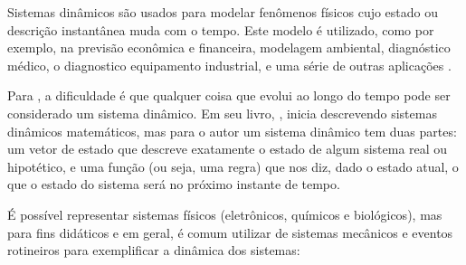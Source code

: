 Sistemas dinâmicos são usados para modelar fenômenos físicos cujo estado ou descrição instantânea muda com o tempo. Este modelo é utilizado, como por exemplo, na previsão econômica e financeira, modelagem ambiental, diagnóstico médico, o diagnostico equipamento industrial, e uma série de outras aplicações \cite{Dean1991}.

Para , a dificuldade é que qualquer coisa que evolui ao longo do tempo pode ser considerado um sistema dinâmico. Em seu livro, , inicia descrevendo sistemas dinâmicos matemáticos, mas para o autor um sistema dinâmico tem duas partes: um vetor de estado que descreve exatamente o estado de algum sistema real ou hipotético, e uma função (ou seja, uma regra) que nos diz, dado o estado atual, o que o estado do sistema será no próximo instante de tempo.

É possível representar sistemas físicos (eletrônicos, químicos e biológicos), mas para fins didáticos e em geral, é comum utilizar de sistemas mecânicos e eventos rotineiros para exemplificar a dinâmica dos sistemas:

